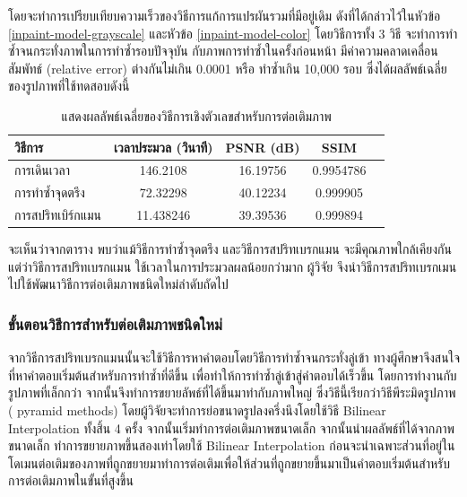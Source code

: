 \documentclass[hidelinks, a4paper,12pt]{article}
\numberwithin{equation}{section}							%
\numberwithin{equation}{section}
\begin{document}
{	\hspace{1cm} โดยจะทำการเปรียบเทียบความเร็วของวิธีการแก้การแปรผันรวมที่มีอยู่เดิม ดังที่ได้กล่าวไว้ในหัวข้อ \ref{inpaint-model-grayscale} และหัวข้อ \ref{inpaint-model-color} โดยวิธีการทั้ง 3 วิธี จะทำการทำซ้ำจนกระทั่งภาพในการทำซ้ำรอบปัจจุบัน กับภาพการทำซ้ำในครั้งก่อนหน้า มีค่าความคลาดเคลื่อนสัมพัทธ์ (relative error) ต่างกันไม่เกิน 0.0001 หรือ ทำซ้ำเกิน 10,000 รอบ ซึ่งได้ผลลัพธ์เฉลี่ยของรูปภาพที่ใช้ทดสอบดังนี้

	\begin{table}[H]
		\centering
		\begin{tabular}[ht]{|l|c|c|c|c|}
			\hline
			วิธีการ  & เวลาประมวล  (วินาที) & PSNR (dB) & SSIM \\
			\hline
			การเดินเวลา & 146.2108 & 16.19756 & 0.9954786\\
			การทำซ้ำจุดตรึง & 72.32298 & 40.12234 & 0.999905\\
			การสปริทเบิร์กแมน & 11.438246 & 39.39536 & 0.999894 \\
			\hline
		\end{tabular}
		\caption{แสดงผลลัพธ์เฉลี่ยของวิธีการเชิงตัวเลขสำหรับการต่อเติมภาพ}
	\end{table}	
	\hspace{1cm} จะเห็นว่าจากตาราง พบว่าแม้วิธีการทำซ้ำจุดตรึง และวิธีการสปริทเบรกแมน จะมีคุณภาพใกล้เคียงกัน แต่ว่าวิธีการสปริทเบรกแมน ใช้เวลาในการประมวลผลน้อยกว่ามาก ผู้วิจัย จึงนำวิธีการสปริทเบรกเมนไปใช้พัฒนาวิธีการต่อเติมภาพชนิดใหม่ลำดับถัดไป
	
	\subsubsection{ขั้นตอนวิธีการสำหรับต่อเติมภาพชนิดใหม่}
	\hspace{1cm} จากวิธีการสปริทเบรกแมนนั้นจะใช้วิธีการหาคำตอบโดยวิธีการทำซ้ำจนกระทั่งลู่เข้า ทางผู้ศึกษาจึงสนใจที่หาคำตอบเริ่มต้นสำหรับการทำซ้ำที่ดีขึ้น เพื่อทำให้การทำซ้ำลู่เข้าสู่คำตอบได้เร็วขึ้น โดยการทำงานกับรูปภาพที่เล็กกว่า จากนั้นจึงทำการขยายลัพธ์ที่ได้ขึ้นมาทำกับภาพใหญ่ ซึ่งวิธีนี้เรียกว่าวิธีพีระมิดรูปภาพ ( pyramid methods) \cite{ref:image-pyramid}  โดยผู้วิจัยจะทำการย่อขนาดรูปลงครึ่งนึงโดยใช้วิธี Bilinear Interpolation ทั้งสิ้น 4 ครั้ง จากนั้นเริ่มทำการต่อเติมภาพขนาดเล็ก จากนั้นนำผลลัพธ์ที่ได้จากภาพขนาดเล็ก ทำการขยายภาพขึ้นสองเท่าโดยใช้ Bilinear Interpolation
	 ก่อนจะนำเฉพาะส่วนที่อยู่ในโดเมนต่อเติมของภาพที่ถูกขยายมาทำการต่อเติมเพื่อให้ส่วนที่ถูกขยายขึ้นมาเป็นคำตอบเริ่มต้นสำหรับการต่อเติมภาพในขั้นที่สูงขึ้น
	 
}
\end{document}
